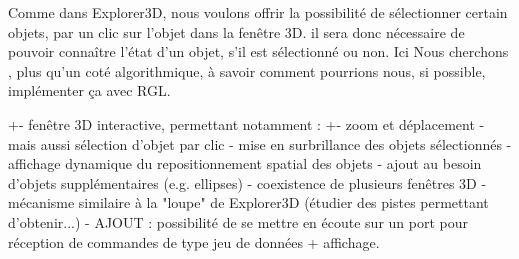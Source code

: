 Comme dans Explorer3D, nous voulons offrir la possibilité de sélectionner certain objets, par un clic sur l'objet dans la fenêtre 3D. il sera donc nécessaire de pouvoir connaître l'état d'un objet, s’il est sélectionné ou non. Ici Nous cherchons , plus qu'un coté algorithmique, à savoir comment pourrions nous, si possible, implémenter ça avec RGL. 


+- fenêtre 3D interactive, permettant notamment :
+- zoom et déplacement
 - mais aussi sélection d'objet par clic
 - mise en surbrillance des objets sélectionnés
 - affichage dynamique du repositionnement spatial des objets
 - ajout au besoin d'objets supplémentaires (e.g. ellipses)
- coexistence de plusieurs fenêtres 3D
- mécanisme similaire à la "loupe" de Explorer3D (étudier des pistes permettant d'obtenir...)
- AJOUT : possibilité de se mettre en écoute sur un port pour réception de commandes de type jeu de données + affichage.

\newpage